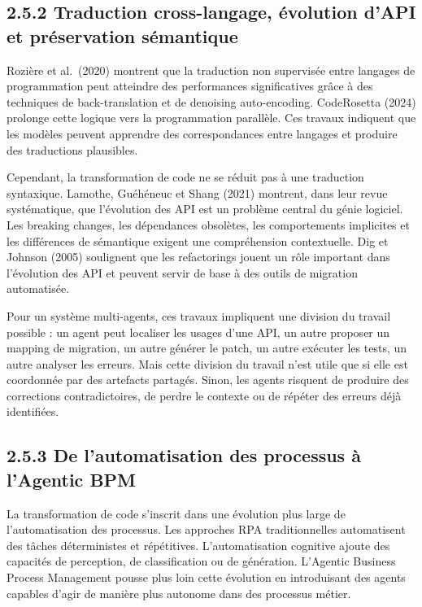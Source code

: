 \subsection{2.5.2 Traduction cross-langage, évolution d'API et préservation sémantique}\label{traduction-cross-langage-uxe9volution-dapi-et-pruxe9servation-suxe9mantique}

Rozière et al.~(2020) montrent que la traduction non supervisée entre langages de programmation peut atteindre des performances significatives grâce à des techniques de back-translation et de denoising auto-encoding. CodeRosetta (2024) prolonge cette logique vers la programmation parallèle. Ces travaux indiquent que les modèles peuvent apprendre des correspondances entre langages et produire des traductions plausibles.

Cependant, la transformation de code ne se réduit pas à une traduction syntaxique. Lamothe, Guéhéneuc et Shang (2021) montrent, dans leur revue systématique, que l'évolution des API est un problème central du génie logiciel. Les breaking changes, les dépendances obsolètes, les comportements implicites et les différences de sémantique exigent une compréhension contextuelle. Dig et Johnson (2005) soulignent que les refactorings jouent un rôle important dans l'évolution des API et peuvent servir de base à des outils de migration automatisée.

Pour un système multi-agents, ces travaux impliquent une division du travail possible : un agent peut localiser les usages d'une API, un autre proposer un mapping de migration, un autre générer le patch, un autre exécuter les tests, un autre analyser les erreurs. Mais cette division du travail n'est utile que si elle est coordonnée par des artefacts partagés. Sinon, les agents risquent de produire des corrections contradictoires, de perdre le contexte ou de répéter des erreurs déjà identifiées.

\subsection{2.5.3 De l'automatisation des processus à l'Agentic BPM}\label{de-lautomatisation-des-processus-uxe0-lagentic-bpm}

La transformation de code s'inscrit dans une évolution plus large de l'automatisation des processus. Les approches RPA traditionnelles automatisent des tâches déterministes et répétitives. L'automatisation cognitive ajoute des capacités de perception, de classification ou de génération. L'Agentic Business Process Management pousse plus loin cette évolution en introduisant des agents capables d'agir de manière plus autonome dans des processus métier.

